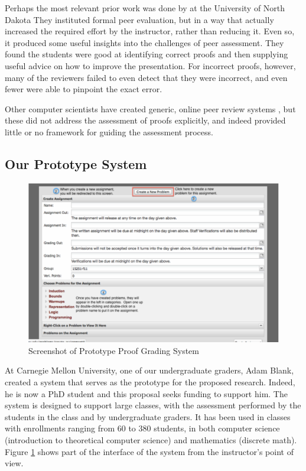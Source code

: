 \documentclass[12pt]{article}
\begin{document}
Perhaps the most relevant prior work was done by \citet{zerr-primus11} at the
University of North Dakota
They instituted formal peer evaluation, but
in a way that actually increased the required effort by the
instructor, rather than reducing it.  Even so, it produced some
useful insights into the challenges of peer assessment.  They found
the students were good at identifying correct proofs and then
supplying useful advice on how to improve the presentation.  For
incorrect proofs, however, many of the reviewers failed to even detect
that they were incorrect, and even fewer were able to pinpoint the exact error.

Other computer scientists have created generic, online peer review systems
\citep{gehringer-sigcse05, wolfe-ite04}, but these did not address the
assessment of proofs explicitly, and indeed provided little or no
framework for guiding the assessment process.

\subsection{Our Prototype System}

\begin{figure}
\begin{center}
\includegraphics[scale=0.45]{screenshot-grading}
\end{center}
\caption{Screenshot of Prototype Proof Grading System}
\label{fig:screenshot}
\end{figure}

At Carnegie Mellon University, one of our undergraduate graders, Adam
Blank, created a system that serves as the prototype for the proposed
research.  Indeed, he is now a PhD student and this proposal seeks
funding to support him.  The system is designed to support large classes,
with the assessment performed by the students in the class and by
undergraduate graders.  It has been used in classes with enrollments
ranging from 60 to 380 students, in both computer science (introduction
to theoretical computer science) and mathematics (discrete math). 
Figure \ref{fig:screenshot} shows part of the interface of the system 
from the instructor's point of view.
\end{document}
